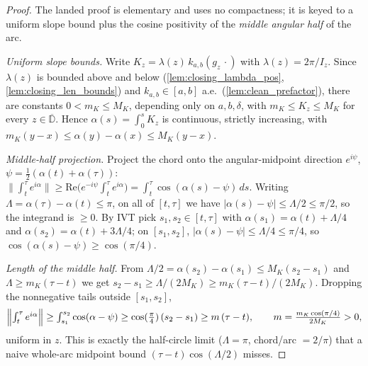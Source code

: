 \begin{proof}
  \leanok
  The landed proof is elementary and uses no compactness; it is keyed to a uniform
  slope bound plus the cosine positivity of the \emph{middle angular half} of the arc.

  \emph{Uniform slope bounds.} Write $K_z=\lambda(z)\,k_{a,b}(g_z\,\cdot)$ with
  $\lambda(z)=2\pi/I_z$. Since $\lambda(z)$ is bounded above and below
  (\cref{lem:closing_lambda_pos}, \cref{lem:closing_len_bounds}) and
  $k_{a,b}\in[a,b]$ a.e.\ (\cref{lem:clean_prefactor}), there are constants
  $0<m_K\le M_K$, depending only on $a,b,\delta$, with $m_K\le K_z\le M_K$ for every
  $z\in\overline{\mathbb D}$. Hence $\alpha(s)=\int_0^s K_z$ is continuous, strictly
  increasing, with $m_K(y-x)\le\alpha(y)-\alpha(x)\le M_K(y-x)$.

  \emph{Middle-half projection.} Project the chord onto the angular-midpoint direction
  $e^{i\psi}$, $\psi=\tfrac12(\alpha(t)+\alpha(\tau))$:
  $\|\int_t^\tau e^{i\alpha}\|\ge\mathrm{Re}\bigl(e^{-i\psi}\int_t^\tau e^{i\alpha}\bigr)
  =\int_t^\tau\cos(\alpha(s)-\psi)\,ds$. Writing $\Lambda=\alpha(\tau)-\alpha(t)\le\pi$,
  on all of $[t,\tau]$ we have $|\alpha(s)-\psi|\le\Lambda/2\le\pi/2$, so the integrand
  is $\ge0$. By IVT pick $s_1,s_2\in[t,\tau]$ with $\alpha(s_1)=\alpha(t)+\Lambda/4$ and
  $\alpha(s_2)=\alpha(t)+3\Lambda/4$; on $[s_1,s_2]$, $|\alpha(s)-\psi|\le\Lambda/4\le\pi/4$,
  so $\cos(\alpha(s)-\psi)\ge\cos(\pi/4)$.

  \emph{Length of the middle half.} From $\Lambda/2=\alpha(s_2)-\alpha(s_1)\le M_K(s_2-s_1)$
  and $\Lambda\ge m_K(\tau-t)$ we get $s_2-s_1\ge\Lambda/(2M_K)\ge m_K(\tau-t)/(2M_K)$.
  Dropping the nonnegative tails outside $[s_1,s_2]$,
  \[
    \Bigl\|\textstyle\int_t^\tau e^{i\alpha}\Bigr\|\ge\int_{s_1}^{s_2}\cos(\alpha-\psi)
    \ge\cos(\tfrac\pi4)\,(s_2-s_1)\ge m\,(\tau-t),\qquad m=\frac{m_K\cos(\pi/4)}{2M_K}>0,
  \]
  uniform in $z$. This is exactly the half-circle limit ($\Lambda=\pi$, chord/arc $=2/\pi$)
  that a naive whole-arc midpoint bound $(\tau-t)\cos(\Lambda/2)$ misses.
\end{proof}

